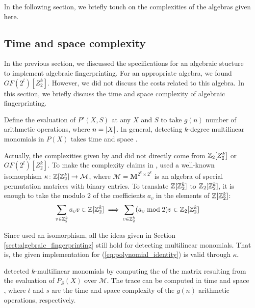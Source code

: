 In the following section, we briefly touch on the complexities of the 
algebras given here. 

\subsection{Time and space complexity}
\label{sect:complexity}

In the previous section, we discussed the specifications 
for an algebraic stucture to implement algebraic fingerprinting. 
For an appropriate algebra, we found $GF(2^{l})[Z_2^k]$. 
However, we did not discuss the costs related 
to this algebra. In this section, we briefly discuss the time and space complexity 
of algebraic fingerprinting.

Define the evaluation of $P'(X, S)$ at any $X$ and $S$ to take $g(n)$ number of  
arithmetic operations, where $n = {\left\vert X\right\vert}$. In general, 
detecting $k$-degree multilinear monomials in $P(X)$ takes 
 time and  space \cite{Williams09}.

Actually, the complexities given by \citeauthor{Koutis08} \cite{Koutis08} and 
\citeauthor{Williams09} \cite{Williams09} did not directly come from 
$\mathbb Z_2[Z_2^k]$ or $GF(2^{l})[Z_2^k]$. 
To make the complexity claims in \cite{Koutis08}, 
\citeauthor{Koutis08} used a well-known \cite{Terras99} isomorphism 
$\kappa \colon \mathbb Z[\mathbb Z_2^k] \to \mathcal{M}$, where $\mathcal{M} = \mathbf{M}^{2^k \times 2^k}$ 
is an algebra of special permutation matrices with binary entries. To translate $\mathbb Z[\mathbb Z_2^k]$ to 
$\mathbb Z_2[\mathbb Z_2^k]$, it is enough to take the modulo 2 of the coefficients $a_v$ in 
the elements of $\mathbb Z[\mathbb Z_2^k]$: 
\[
  \sum_{v \in \mathbb Z_2^k}a_v v \in \mathbb Z[\mathbb Z_2^k] \implies 
  \displaystyle \sum_{v \in \mathbb Z_2^k}(a_v \bmod 2) v \in \mathbb Z_2[\mathbb Z_2^k]
\]

Since \citeauthor{Koutis08} 
used an isomorphism, all the ideas given in 
Section \ref{sect:algebraic_fingerprinting} still hold for 
detecting multilinear monomials. That is, 
the given implementation for (\ref{eq:polynomial_identity}) is valid through $\kappa$.

\citeauthor{Koutis08} \cite{Koutis08} detected $k$-multilinear monomials 
by computing the  of the matrix resulting 
from the evaluation of $P_S(X)$ over $\mathcal{M}$. The trace can be computed 
in time  and space , where $t$ and $s$ are the time 
and space complexity of the $g(n)$ arithmetic operations, respectively. 


